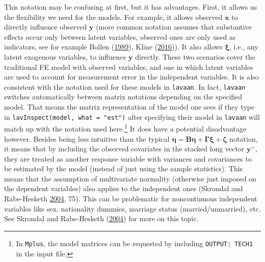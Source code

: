 \documentclass[
  12pt,
  a4paper]{article}
\begin{document}
This notation may be confusing at first, but it has advantages. First,
it allows us the flexibility we need for the models. For example, it
allows observed \(\bm{x}\) to directly influence observed \(\bm{y}\)
(more common notation assumes that substantive effects occur only
between latent variables, observed ones are only used as indicators, see
for example Bollen (\protect\hyperlink{ref-Bollen1989}{1989}), Kline
(\protect\hyperlink{ref-Kline2016}{2016})). It also allows \(\bm{\xi}\),
i.e., any latent exogenous variables, to influence \(\bm{y}\) directly.
These two scenarios cover the traditional FE model with observed
variables, and one in which latent variables are used to account for
measurement error in the independent variables. It is also consistent
with the notation used for these models in \texttt{lavaan}. In fact,
\texttt{lavaan} switches automatically between matrix notations
depending on the specified model. That means the matrix representation
of the model one sees if they type in
\texttt{lavInspect(model,\ what\ =\ "est")} after specifying their model
in \texttt{lavaan} will match up with the notation used here.\footnote{In
  \texttt{Mplus}, the model matrices can be requested by including
  \texttt{OUTPUT:\ TECH1} in the input file.} It does have a potential
disadvantage however. Besides being less intuitive than the typical
\(\bm{\eta} = \bm{B}\bm{\eta} + \bm{\Gamma}\bm{\xi} + \bm{\zeta}\)
notation, it means that by including the observed covariates in the
stacked long vector \(\bm{y}^{+}\), they are treated as another response
variable with variances and covariances to be estimated by the model
(instead of just using the sample statistics). This means that the
assumption of multivariate normality (otherwise just imposed on the
dependent variables) also applies to the independent ones (Skrondal and
Rabe-Hesketh \protect\hyperlink{ref-Skrondal2004}{2004}, 75). This can
be problematic for noncontinuous independent variables like sex,
nationality dummies, marriage status (married/unmarried), etc. See
Skrondal and Rabe-Hesketh (\protect\hyperlink{ref-Skrondal2004}{2004})
for more on this topic.
\end{document}
